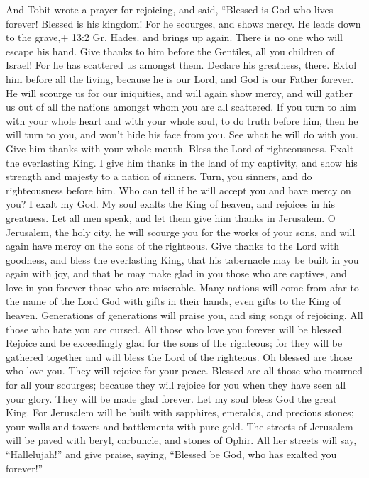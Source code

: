  And Tobit wrote a prayer for rejoicing, and said, ``Blessed
is God who lives forever! Blessed is his kingdom!  For he
scourges, and shows mercy. He leads down to the grave,+ 13:2 Gr. Hades.
and brings up again. There is no one who will escape his hand.
 Give thanks to him before the Gentiles, all you children of
Israel! For he has scattered us amongst them.  Declare his
greatness, there. Extol him before all the living, because he is our
Lord, and God is our Father forever.  He will scourge us for
our iniquities, and will again show mercy, and will gather us out of all
the nations amongst whom you are all scattered.  If you turn
to him with your whole heart and with your whole soul, to do truth
before him, then he will turn to you, and won't hide his face from you.
See what he will do with you. Give him thanks with your whole mouth.
Bless the Lord of righteousness. Exalt the everlasting King. I give him
thanks in the land of my captivity, and show his strength and majesty to
a nation of sinners. Turn, you sinners, and do righteousness before him.
Who can tell if he will accept you and have mercy on you?  I
exalt my God. My soul exalts the King of heaven, and rejoices in his
greatness.  Let all men speak, and let them give him thanks
in Jerusalem.  O Jerusalem, the holy city, he will scourge
you for the works of your sons, and will again have mercy on the sons of
the righteous.  Give thanks to the Lord with goodness, and
bless the everlasting King, that his tabernacle may be built in you
again with joy, and that he may make glad in you those who are captives,
and love in you forever those who are miserable.  Many
nations will come from afar to the name of the Lord God with gifts in
their hands, even gifts to the King of heaven. Generations of
generations will praise you, and sing songs of rejoicing. 
All those who hate you are cursed. All those who love you forever will
be blessed.  Rejoice and be exceedingly glad for the sons
of the righteous; for they will be gathered together and will bless the
Lord of the righteous.  Oh blessed are those who love you.
They will rejoice for your peace. Blessed are all those who mourned for
all your scourges; because they will rejoice for you when they have seen
all your glory. They will be made glad forever.  Let my
soul bless God the great King.  For Jerusalem will be built
with sapphires, emeralds, and precious stones; your walls and towers and
battlements with pure gold.  The streets of Jerusalem will
be paved with beryl, carbuncle, and stones of Ophir.  All
her streets will say, ``Hallelujah!'' and give praise, saying, ``Blessed
be God, who has exalted you forever!''

